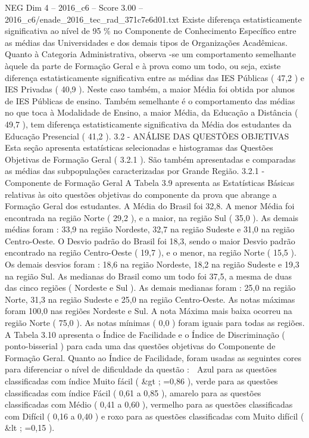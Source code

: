 \begin{textsample}{NEG Dim 4 – 2016\_c6 – Score 3.00 – 2016\_c6/enade\_2016\_tec\_rad\_371c7e6d01.txt}
Existe diferença estatisticamente significativa ao nível de 95 \% no Componente de Conhecimento Específico entre as médias das Universidades e dos demais tipos de Organizações Acadêmicas.
Quanto à Categoria Administrativa, observa -se um comportamento semelhante àquele da parte de Formação Geral e à prova como um todo, ou seja, existe diferença estatisticamente significativa entre as médias das IES Públicas ( 47,2 ) e IES Privadas ( 40,9 ).
Neste caso também, a maior Média foi obtida por alunos de IES Públicas de ensino.
Também semelhante é o comportamento das médias no que toca à Modalidade de Ensino, a maior Média, da Educação a Distância ( 49,7 ), tem diferença estatisticamente significativa da Média dos estudantes da Educação Presencial ( 41,2 ). 3.2 - ANÁLISE DAS QUESTÕES OBJETIVAS Esta seção apresenta estatísticas selecionadas e histogramas das Questões Objetivas de Formação Geral ( 3.2.1 ).
São também apresentadas e comparadas as médias das subpopulações caracterizadas por Grande Região. 3.2.1 - Componente de Formação Geral A Tabela 3.9 apresenta as Estatísticas Básicas relativas às oito questões objetivas do componente da prova que abrange a Formação Geral dos estudantes.
A Média do Brasil foi 32,8.
A menor Média foi encontrada na região Norte ( 29,2 ), e a maior, na região Sul ( 35,0 ).
As demais médias foram : 33,9 na região Nordeste, 32,7 na região Sudeste e 31,0 na região Centro-Oeste.
O Desvio padrão do Brasil foi 18,3, sendo o maior Desvio padrão encontrado na região Centro-Oeste ( 19,7 ), e o menor, na região Norte ( 15,5 ).
Os demais desvios foram : 18,6 na região Nordeste, 18,2 na região Sudeste e 19,3 na região Sul.
As medianas do Brasil como um todo foi 37,5, a mesma de duas das cinco regiões ( Nordeste e Sul ).
As demais medianas foram : 25,0 na região Norte, 31,3 na região Sudeste e 25,0 na região Centro-Oeste.
As notas máximas foram 100,0 nas regiões Nordeste e Sul.
A nota Máxima mais baixa ocorreu na região Norte ( 75,0 ).
As notas mínimas ( 0,0 ) foram iguais para todas as regiões.
A Tabela 3.10 apresenta o Índice de Facilidade e o Índice de Discriminação ( ponto-bisserial ) para cada uma das questões objetivas do Componente de Formação Geral.
Quanto ao Índice de Facilidade, foram usadas as seguintes cores para diferenciar o nível de dificuldade da questão :  Azul para as questões classificadas com índice Muito fácil ( \&gt ; =0,86 ), verde para as questões classificadas com índice Fácil ( 0,61 a 0,85 ), amarelo para as questões classificadas com Médio ( 0,41 a 0,60 ), vermelho para as questões classificadas com Difícil ( 0,16 a 0,40 ) e roxo para as questões classificadas com Muito difícil ( \&lt ; =0,15 ).

\end{textsample}
